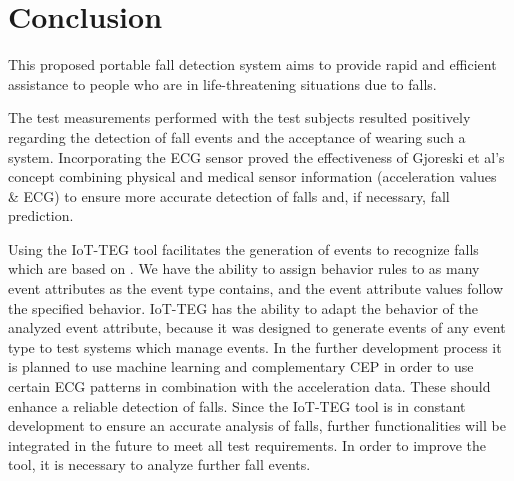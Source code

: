 \documentclass[10pt,journal,compsoc]{IEEEtran}
\begin{document}
\section{Conclusion}
\label{sec:conclusion}
%

This proposed portable fall detection system aims to provide rapid and efficient assistance to people who are in life-threatening situations due to falls. 

The test measurements performed with the test subjects resulted positively regarding the detection of fall events and the acceptance of wearing such a system. Incorporating the ECG sensor proved the effectiveness of Gjoreski et al's concept \cite{Gjoreski2014} combining physical and medical sensor information (acceleration values \& ECG) to ensure more accurate detection of falls and, if necessary, fall prediction. 

Using the IoT-TEG tool \cite{Gutierrez2017,TesisGutierrez2017} facilitates the generation of events to recognize falls which are based on \cite{Kozina}. We have the ability to assign behavior rules to as many event attributes as the event type contains, and the event attribute values follow the specified behavior. IoT-TEG \cite{Gutierrez2017,TesisGutierrez2017} has the ability to adapt the behavior of the analyzed event attribute, because it was designed to generate events of any event type to test systems which manage events. In the further development process it is planned to use machine learning and complementary CEP in order to use certain ECG patterns in combination with the acceleration data. These should enhance a reliable detection of falls. Since the IoT-TEG tool \cite{Gutierrez2017,TesisGutierrez2017} is in constant development to ensure an accurate analysis of falls, further functionalities will be integrated in the future to meet all test requirements. In order to improve the tool, it is necessary to analyze further fall events.
\end{document}
